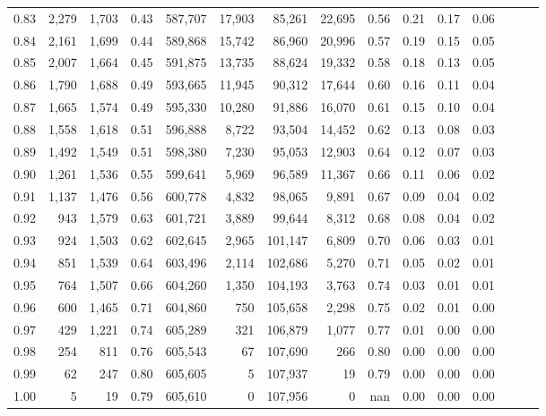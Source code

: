\begin{tabular}{rrrrrrrrrrrrrrr}
0.83 &  2,279 &  1,703 &  0.43 &  587,707 &   17,903 &   85,261 &   22,695 &  0.56 &  0.21 &  0.17 &      0.06 \\
0.84 &  2,161 &  1,699 &  0.44 &  589,868 &   15,742 &   86,960 &   20,996 &  0.57 &  0.19 &  0.15 &      0.05 \\
0.85 &  2,007 &  1,664 &  0.45 &  591,875 &   13,735 &   88,624 &   19,332 &  0.58 &  0.18 &  0.13 &      0.05 \\
0.86 &  1,790 &  1,688 &  0.49 &  593,665 &   11,945 &   90,312 &   17,644 &  0.60 &  0.16 &  0.11 &      0.04 \\
0.87 &  1,665 &  1,574 &  0.49 &  595,330 &   10,280 &   91,886 &   16,070 &  0.61 &  0.15 &  0.10 &      0.04 \\
0.88 &  1,558 &  1,618 &  0.51 &  596,888 &    8,722 &   93,504 &   14,452 &  0.62 &  0.13 &  0.08 &      0.03 \\
0.89 &  1,492 &  1,549 &  0.51 &  598,380 &    7,230 &   95,053 &   12,903 &  0.64 &  0.12 &  0.07 &      0.03 \\
0.90 &  1,261 &  1,536 &  0.55 &  599,641 &    5,969 &   96,589 &   11,367 &  0.66 &  0.11 &  0.06 &      0.02 \\
0.91 &  1,137 &  1,476 &  0.56 &  600,778 &    4,832 &   98,065 &    9,891 &  0.67 &  0.09 &  0.04 &      0.02 \\
0.92 &    943 &  1,579 &  0.63 &  601,721 &    3,889 &   99,644 &    8,312 &  0.68 &  0.08 &  0.04 &      0.02 \\
0.93 &    924 &  1,503 &  0.62 &  602,645 &    2,965 &  101,147 &    6,809 &  0.70 &  0.06 &  0.03 &      0.01 \\
0.94 &    851 &  1,539 &  0.64 &  603,496 &    2,114 &  102,686 &    5,270 &  0.71 &  0.05 &  0.02 &      0.01 \\
0.95 &    764 &  1,507 &  0.66 &  604,260 &    1,350 &  104,193 &    3,763 &  0.74 &  0.03 &  0.01 &      0.01 \\
0.96 &    600 &  1,465 &  0.71 &  604,860 &      750 &  105,658 &    2,298 &  0.75 &  0.02 &  0.01 &      0.00 \\
0.97 &    429 &  1,221 &  0.74 &  605,289 &      321 &  106,879 &    1,077 &  0.77 &  0.01 &  0.00 &      0.00 \\
0.98 &    254 &    811 &  0.76 &  605,543 &       67 &  107,690 &      266 &  0.80 &  0.00 &  0.00 &      0.00 \\
0.99 &     62 &    247 &  0.80 &  605,605 &        5 &  107,937 &       19 &  0.79 &  0.00 &  0.00 &      0.00 \\
1.00 &      5 &     19 &  0.79 &  605,610 &        0 &  107,956 &        0 &   nan &  0.00 &  0.00 &      0.00 \\
\bottomrule
\end{tabular}
